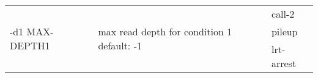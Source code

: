 {\small
\begin{tabular}{@{}p{}p{}l@{}}
\multirow{3}{=}{-d1 MAX-DEPTH1} & \multirow{3}{=}{max read depth for condition 1
default: -1} & call-2 \\
 &  & pileup \\
 &  & lrt-arrest \\
\end{tabular}\\
}
